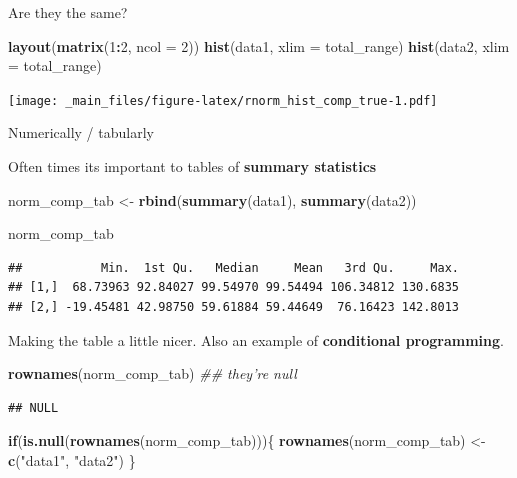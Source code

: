 \documentclass[
]{book}
\newenvironment{Shaded}{\begin{snugshade}}{\end{snugshade}}
\newcommand{\CommentTok}[1]{\textcolor[rgb]{0.56,0.35,0.01}{\textit{#1}}}
\newcommand{\ControlFlowTok}[1]{\textcolor[rgb]{0.13,0.29,0.53}{\textbf{#1}}}
\newcommand{\DataTypeTok}[1]{\textcolor[rgb]{0.13,0.29,0.53}{#1}}
\newcommand{\DecValTok}[1]{\textcolor[rgb]{0.00,0.00,0.81}{#1}}
\newcommand{\KeywordTok}[1]{\textcolor[rgb]{0.13,0.29,0.53}{\textbf{#1}}}
\newcommand{\NormalTok}[1]{#1}
\newcommand{\OperatorTok}[1]{\textcolor[rgb]{0.81,0.36,0.00}{\textbf{#1}}}
\newcommand{\StringTok}[1]{\textcolor[rgb]{0.31,0.60,0.02}{#1}}
\begin{document}
Are they the same?

\begin{Shaded}
\begin{Highlighting}[]
\KeywordTok{layout}\NormalTok{(}\KeywordTok{matrix}\NormalTok{(}\DecValTok{1}\OperatorTok{:}\DecValTok{2}\NormalTok{, }\DataTypeTok{ncol =} \DecValTok{2}\NormalTok{))}
\KeywordTok{hist}\NormalTok{(data1, }\DataTypeTok{xlim =}\NormalTok{ total_range)}
\KeywordTok{hist}\NormalTok{(data2, }\DataTypeTok{xlim =}\NormalTok{ total_range)}
\end{Highlighting}
\end{Shaded}

\texttt{[image: \_main\_files/figure-latex/rnorm\_hist\_comp\_true-1.pdf]}

Numerically / tabularly

Often times its important to tables of \textbf{summary statistics}

\begin{Shaded}
\begin{Highlighting}[]
\NormalTok{norm_comp_tab <-}\StringTok{ }\KeywordTok{rbind}\NormalTok{(}\KeywordTok{summary}\NormalTok{(data1),}
                       \KeywordTok{summary}\NormalTok{(data2))}

\NormalTok{norm_comp_tab}
\end{Highlighting}
\end{Shaded}

\begin{verbatim}
##           Min.  1st Qu.   Median     Mean   3rd Qu.     Max.
## [1,]  68.73963 92.84027 99.54970 99.54494 106.34812 130.6835
## [2,] -19.45481 42.98750 59.61884 59.44649  76.16423 142.8013
\end{verbatim}

Making the table a little nicer. Also an example of \textbf{conditional programming}.

\begin{Shaded}
\begin{Highlighting}[]
\KeywordTok{rownames}\NormalTok{(norm_comp_tab) }\CommentTok{## they're null}
\end{Highlighting}
\end{Shaded}

\begin{verbatim}
## NULL
\end{verbatim}

\begin{Shaded}
\begin{Highlighting}[]
\ControlFlowTok{if}\NormalTok{(}\KeywordTok{is.null}\NormalTok{(}\KeywordTok{rownames}\NormalTok{(norm_comp_tab)))\{}
  \KeywordTok{rownames}\NormalTok{(norm_comp_tab) <-}\StringTok{ }\KeywordTok{c}\NormalTok{(}\StringTok{"data1"}\NormalTok{, }\StringTok{"data2"}\NormalTok{)}
\NormalTok{\}}
\end{Highlighting}
\end{Shaded}
\end{document}

